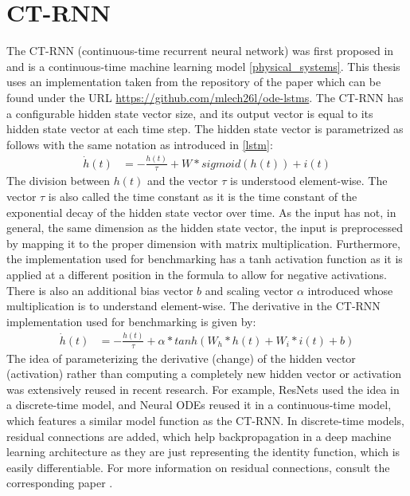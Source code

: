 \documentclass[draft,final]{vutinfth} %
\begin{document}
\section{CT-RNN} \label{ctrnn}
The CT-RNN (continuous-time recurrent neural network) was first proposed in \cite{CTRNN} and is a continuous-time machine learning model \ref{physical_systems}.
This thesis uses an implementation taken from the repository of the paper \cite{ODELSTM} which can be found under the URL \url{https://github.com/mlech26l/ode-lstms}.
The CT-RNN has a configurable hidden state vector size, and its output vector is equal to its hidden state vector at each time step.
The hidden state vector is parametrized as follows \cite[p. 2]{CTRNN} with the same notation as introduced in \ref{lstm}:
\begin{align}
\label{paper_ct_rnn_function}
\dot h(t) &= -\frac{h(t)}{\tau} + W * sigmoid(h(t)) + i(t)
\end{align}
The division between $h(t)$ and the vector $\tau$ is understood element-wise. The vector $\tau$ is also called the time constant as it is the time constant of the exponential decay of the hidden state vector over time.
As the input has not, in general, the same dimension as the hidden state vector, the input is preprocessed by mapping it to the proper dimension with matrix multiplication.
Furthermore, the implementation used for benchmarking has a tanh activation function as it is applied at a different position in the formula to allow for negative activations.
There is also an additional bias vector $b$ and scaling vector $\alpha$ introduced whose multiplication is to understand element-wise.
The derivative in the CT-RNN implementation used for benchmarking is given by:
\begin{align}
\label{used_ct_rnn_function}
\dot h(t) &= -\frac{h(t)}{\tau} + \alpha * tanh(W_h * h(t) + W_i * i(t) + b)
\end{align}
The idea of parameterizing the derivative (change) of the hidden vector (activation) rather than computing a completely new hidden vector or activation was extensively reused in recent research.
For example, ResNets \cite{ResNet} used the idea in a discrete-time model, and Neural ODEs \cite{NeuralODEs} reused it in a continuous-time model, which features a similar model function as the CT-RNN.
In discrete-time models, residual connections are added, which help backpropagation in a deep machine learning architecture as they are just representing the identity function, which is easily differentiable.
For more information on residual connections, consult the corresponding paper \cite{ResNet}.
\end{document}
